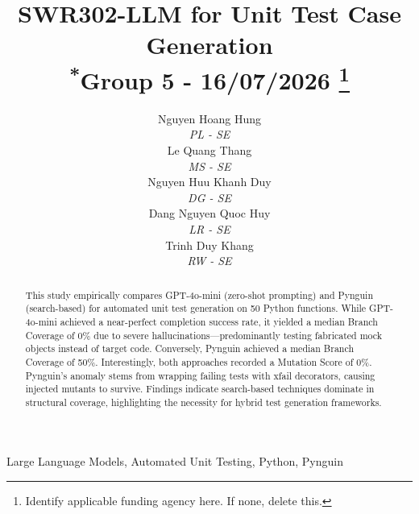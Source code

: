 \documentclass[conference]{IEEEtran}
\begin{document}
\title{SWR302-LLM for Unit Test Case Generation\\
{\footnotesize \textsuperscript{*}Group 5 - 16/07/2026}
\thanks{Identify applicable funding agency here. If none, delete this.}
}
\author{
\begin{minipage}[t]{0.19\textwidth}
\centering
Nguyen Hoang Hung\\
\textit{PL - SE}
\end{minipage}
\hfill
\begin{minipage}[t]{0.19\textwidth}
\centering
Le Quang Thang\\
\textit{MS - SE}
\end{minipage}
\hfill
\begin{minipage}[t]{0.19\textwidth}
\centering
Nguyen Huu Khanh Duy\\
\textit{DG - SE}
\end{minipage}
\hfill
\begin{minipage}[t]{0.19\textwidth}
\centering
Dang Nguyen Quoc Huy\\
\textit{LR - SE}
\end{minipage}
\hfill
\begin{minipage}[t]{0.19\textwidth}
\centering
Trinh Duy Khang\\
\textit{RW - SE}
\end{minipage}
}
\maketitle
\begin{abstract}
This study empirically compares GPT-4o-mini (zero-shot prompting) and Pynguin (search-based) for automated unit test generation on 50 Python functions. While GPT-4o-mini achieved a near-perfect completion success rate, it yielded a median Branch Coverage of 0\% due to severe hallucinations---predominantly testing fabricated mock objects instead of target code. Conversely, Pynguin achieved a median Branch Coverage of 50\%. Interestingly, both approaches recorded a Mutation Score of 0\%. Pynguin's anomaly stems from wrapping failing tests with xfail decorators, causing injected mutants to survive. Findings indicate search-based techniques dominate in structural coverage, highlighting the necessity for hybrid test generation frameworks.
\end{abstract}
\begin{IEEEkeywords}
Large Language Models, Automated Unit Testing, Python, Pynguin
\end{IEEEkeywords}
\end{document}
